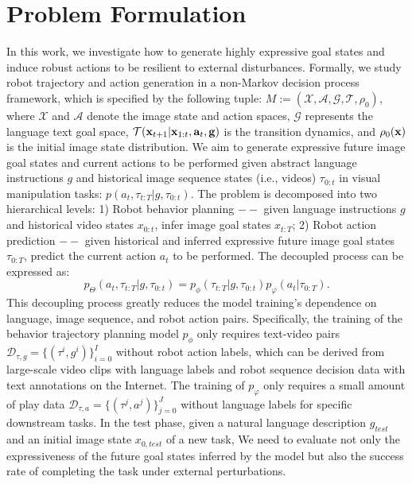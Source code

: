 \section{Problem Formulation}
In this work, we investigate how to generate highly expressive goal states and induce robust actions to be resilient to external disturbances. 
Formally, we study robot trajectory and action generation in a non-Markov decision process framework, which is specified by the following tuple: ${M} := (\mathcal{X}, \mathcal{A}, \mathcal{G}, \mathcal{T}, \rho_0)$, where $\mathcal{X}$ and $\mathcal{A}$ denote the image state and action spaces, $\mathcal{G}$ represents the language text goal space, $\mathcal{T}(\mathbf{x}_{t+1}|\mathbf{x}_{1:t},\mathbf{a}_t,\mathbf{g})$ is the transition dynamics, and $\rho_0(\mathbf{x})$ is the initial image state distribution.
We aim to generate expressive future image goal states and current actions to be performed given abstract language instructions $g$ and historical image sequence states (i.e., videos) $\tau_{0:t}$ in visual manipulation tasks: $p(a_t,\tau_{t:T}|g,\tau_{0:t})$.
The problem is decomposed into two hierarchical levels: 1) Robot behavior planning $--$ given language instructions $g$ and historical video states $x_{0:t}$, infer image goal states $x_{t:T}$; 2) Robot action prediction $--$ given historical and inferred expressive future image goal states $\tau_{0:T}$, predict the current action $a_t$ to be performed. 
The decoupled process can be expressed as:
\begin{equation}
p_{\Theta}(a_t,\tau_{t:T}|g,\tau_{0:t})=p_{\phi}(\tau_{t:T}|g, \tau_{0:t})p_{\varphi}(a_t|\tau_{0:T}).
\end{equation}
This decoupling process greatly reduces the model training's dependence on language, image sequence, and robot action pairs. 
Specifically, the training of the behavior trajectory planning model $p_{\phi}$ only requires text-video pairs $\mathcal{D}_{\tau,g}=\{(\tau^i,g^i)\}_{i=0}^{I}$ without robot action labels, which can be derived from large-scale video clips with language labels and robot sequence decision data with text annotations on the Internet. 
The training of $p_{\varphi}$ only requires a small amount of play data $\mathcal{D}_{\tau,a}=\{(\tau^j,a^j)\}_{j=0}^{J}$ without language labels for specific downstream tasks.
In the test phase, given a natural language description $g_{test}$ and an initial image state $x_{0,test}$ of a new task, We need to evaluate not only the expressiveness of the future goal states inferred by the model but also the success rate of completing the task under external perturbations.

